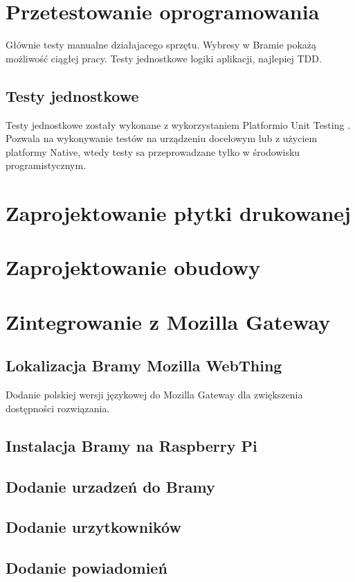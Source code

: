 \documentclass[12pt]{report}
\begin{document}
 
 \chapter{Przetestowanie oprogramowania}
 Głównie testy manualne działajacego sprzętu.
 Wybresy w Bramie pokażą możliwość ciągłej pracy.
 Testy jednostkowe logiki aplikacji, najlepiej TDD.
 \section{Testy jednostkowe}
 Testy jednostkowe zostały wykonane z wykorzystaniem Platformio Unit Testing \cite{PIOUnitTesting}. Pozwala na wykonywanie testów na urządzeniu docelowym lub z użyciem platformy Native, wtedy testy sa przeprowadzane tylko w środowisku programistycznym.
 
 
 \chapter{Zaprojektowanie płytki drukowanej}
 
 
 \chapter{Zaprojektowanie obudowy}

 
 \chapter{Zintegrowanie z Mozilla Gateway}
 \section{Lokalizacja Bramy Mozilla WebThing}
 Dodanie polskiej wersji językowej do Mozilla Gateway dla zwiększenia dostępności rozwiązania.
 \section{Instalacja Bramy na Raspberry Pi}
 \section{Dodanie urzadzeń do Bramy}
 \section{Dodanie urzytkowników}
 \section{Dodanie powiadomień}
 
\end{document}
